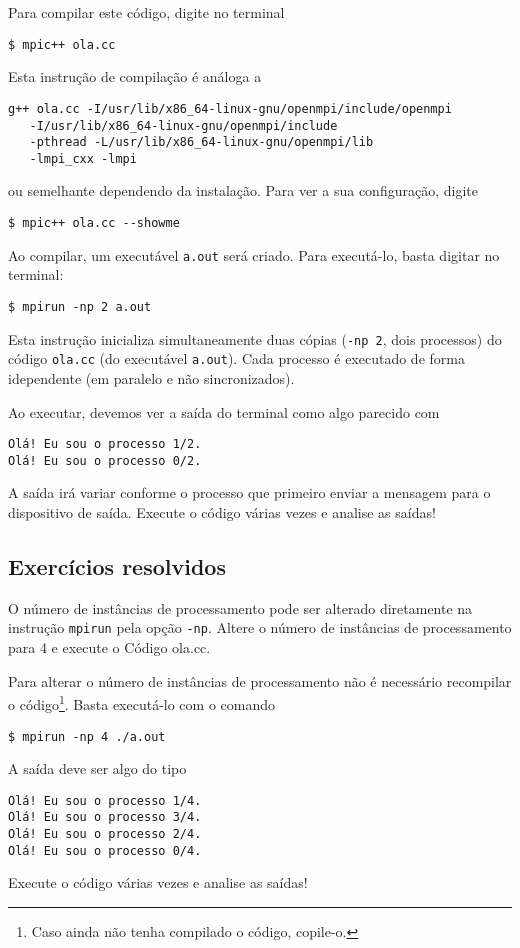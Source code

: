 Para compilar este código, digite no terminal
\begin{verbatim}
$ mpic++ ola.cc
\end{verbatim}
Esta instrução de compilação é análoga a
\begin{verbatim}
g++ ola.cc -I/usr/lib/x86_64-linux-gnu/openmpi/include/openmpi
   -I/usr/lib/x86_64-linux-gnu/openmpi/include 
   -pthread -L/usr/lib/x86_64-linux-gnu/openmpi/lib 
   -lmpi_cxx -lmpi
\end{verbatim}
ou semelhante dependendo da instalação. Para ver a sua configuração, digite
\begin{verbatim}
$ mpic++ ola.cc --showme
\end{verbatim}


Ao compilar, um executável \verb+a.out+ será criado. Para executá-lo, basta digitar no terminal:
\begin{verbatim}
$ mpirun -np 2 a.out
\end{verbatim}
Esta instrução inicializa simultaneamente duas cópias (\verb+-np 2+, dois processos) do código \verb+ola.cc+ (do executável \verb+a.out+). Cada processo é executado de forma idependente (em paralelo e não sincronizados).

Ao executar, devemos ver a saída do terminal como algo parecido com
\begin{verbatim}
Olá! Eu sou o processo 1/2.
Olá! Eu sou o processo 0/2.
\end{verbatim}

A saída irá variar conforme o processo que primeiro enviar a mensagem para o dispositivo de saída. Execute o código várias vezes e analise as saídas!

\subsection*{Exercícios resolvidos}

\begin{exeresol}
  O número de instâncias de processamento pode ser alterado diretamente na instrução \verb+mpirun+ pela opção \verb+-np+. Altere o número de instâncias de processamento para 4 e execute o Código ola.cc.
\end{exeresol}
\begin{resol}
  Para alterar o número de instâncias de processamento não é necessário recompilar o código\footnote{Caso ainda não tenha compilado o código, copile-o.}. Basta executá-lo com o comando
\begin{verbatim}
$ mpirun -np 4 ./a.out
\end{verbatim}
  A saída deve ser algo do tipo
\begin{verbatim}
Olá! Eu sou o processo 1/4.
Olá! Eu sou o processo 3/4.
Olá! Eu sou o processo 2/4.
Olá! Eu sou o processo 0/4.
\end{verbatim}
  Execute o código várias vezes e analise as saídas!
\end{resol}

